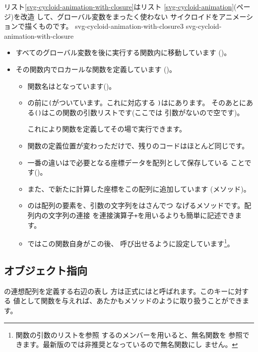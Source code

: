 リスト\ref{svg-cycloid-animation-with-closure}はリスト
\ref{svg-cycloid-animation}(\pageref{svg-cycloid-animation}ページ)を改造
して、グローバル変数をまったく使わない
サイクロイドをアニメーションで描くものです。
{svg-cycloid-animation-with-closure3}
{svg-cycloid-animation-with-closure}
\begin{itemize}
 \item すべてのグローバル変数を後に実行する関数内に移動しています
       ()。
 \item その関数内でロカールな関数を定義しています
			 ()。
\begin{itemize}
 \item 関数名はとなっています()。
 \item {}の前に\texttt{(}がついています。これに対応する
			 \texttt{)}はにあります。
  そのあとにある\texttt{()}はこの関数の引数リストです(ここでは
			 引数がないので空です)。
			 
  これにより関数を定義してその場で実行できます。
 \item 関数の定義位置が変わっただけで、残りのコードはほとんど同じです。
 \item 一番の違いはで必要となる座標データを配列として保存している
			 ことです()。
 \item また、で新たに計算した座標をこの配列に追加しています
			 (メソッド)。
 \item {}のは配列の要素を、引数の文字列をはさんでつ
       なげるメソッドです。配列内の文字列の連接
       を連接演算子\texttt{+}を用いるよりも簡単に記述できます。
 \item {}ではこの関数自身がこの後、
			 呼び出せるように設定しています\footnote{関数の引数のリストを参照
			 するのメンバーを用いると、無名関数を
			 参照できます。最新版の\JS では非推奨となっているので無名関数にし
			 ません。}。
\end{itemize}

\end{itemize}
\iffalse
	\subsection{オブジェクト指向\JS}
\JS の連想配列を定義する右辺の表し
方は正式にはと呼ばれます。このキーに対する
値として関数を与えれば、あたかもメソッドのように取り扱うことができます。

